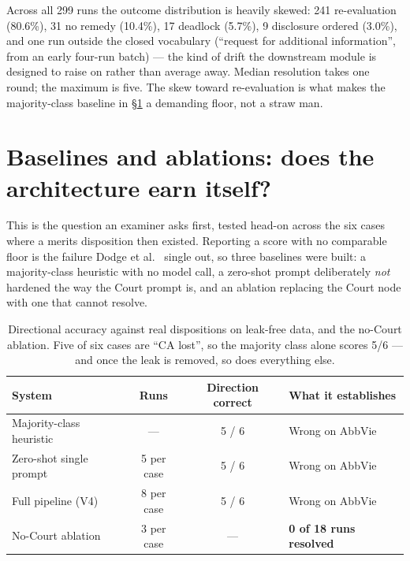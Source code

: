 Across all 299 runs the outcome distribution is heavily skewed: 241
re-evaluation (80.6\%), 31 no remedy (10.4\%), 17 deadlock (5.7\%), 9
disclosure ordered (3.0\%), and one run outside the closed vocabulary
(``request for additional information'', from an early four-run batch) ---
the kind of drift the downstream module is designed to raise on rather than
average away. Median resolution takes one round; the maximum is five. The
skew toward re-evaluation is what makes the majority-class baseline in
\S\ref{sec:baselines} a demanding floor, not a straw man.

\section{Baselines and ablations: does the architecture earn itself?}
\label{sec:baselines}

This is the question an examiner asks first, tested head-on across the six
cases where a merits disposition then existed. Reporting a
score with no comparable floor is the failure Dodge et al.\
\cite{dodge2019showyourwork} single out, so three baselines were built: a
majority-class heuristic with no model call, a zero-shot prompt deliberately
\emph{not} hardened the way the Court prompt is, and an ablation replacing
the Court node with one that cannot resolve.

\begin{table}[htbp]
\centering
\footnotesize
\caption[Baseline comparison]{Directional accuracy against real dispositions
on leak-free data, and the no-Court ablation. Five of six cases are ``CA
lost'', so the majority class alone scores 5/6 --- and once the leak is
removed, so does everything else.}
\label{tab:baselines}
\begin{tabularx}{\textwidth}{@{}>{\raggedright\arraybackslash}p{4.3cm}ccX@{}}
\toprule
\textbf{System} & \textbf{Runs} & \textbf{Direction correct} & \textbf{What it establishes} \\
\midrule
Majority-class heuristic & --- & 5 / 6 & Wrong on AbbVie \\
Zero-shot single prompt & 5 per case & 5 / 6 & Wrong on AbbVie \\
Full pipeline (V4) & 8 per case & 5 / 6 & Wrong on AbbVie \\
No-Court ablation & 3 per case & --- & \textbf{0 of 18 runs resolved} \\
\bottomrule
\end{tabularx}
\end{table}

